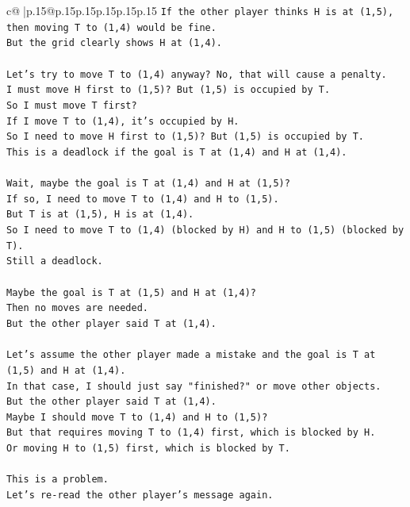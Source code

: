 \documentclass{article}
\begin{document}
{\begin{supertabular}{c@{$\;$}|p{.15\linewidth}@{}p{.15\linewidth}p{.15\linewidth}p{.15\linewidth}p{.15\linewidth}p{.15\linewidth}}
{{{\texttt{If the other player thinks H is at (1,5), then moving T to (1,4) would be fine.} \\
\texttt{But the grid clearly shows H at (1,4).} \\
\\ 
\texttt{Let's try to move T to (1,4) anyway? No, that will cause a penalty.} \\
\texttt{I must move H first to (1,5)? But (1,5) is occupied by T.} \\
\texttt{So I must move T first?} \\
\texttt{If I move T to (1,4), it's occupied by H.} \\
\texttt{So I need to move H first to (1,5)? But (1,5) is occupied by T.} \\
\texttt{This is a deadlock if the goal is T at (1,4) and H at (1,4).} \\
\\ 
\texttt{Wait, maybe the goal is T at (1,4) and H at (1,5)?} \\
\texttt{If so, I need to move T to (1,4) and H to (1,5).} \\
\texttt{But T is at (1,5), H is at (1,4).} \\
\texttt{So I need to move T to (1,4) (blocked by H) and H to (1,5) (blocked by T).} \\
\texttt{Still a deadlock.} \\
\\ 
\texttt{Maybe the goal is T at (1,5) and H at (1,4)?} \\
\texttt{Then no moves are needed.} \\
\texttt{But the other player said T at (1,4).} \\
\\ 
\texttt{Let's assume the other player made a mistake and the goal is T at (1,5) and H at (1,4).} \\
\texttt{In that case, I should just say "finished?" or move other objects.} \\
\texttt{But the other player said T at (1,4).} \\
\texttt{Maybe I should move T to (1,4) and H to (1,5)?} \\
\texttt{But that requires moving T to (1,4) first, which is blocked by H.} \\
\texttt{Or moving H to (1,5) first, which is blocked by T.} \\
\\ 
\texttt{This is a problem.} \\
\texttt{Let's re{-}read the other player's message again.} \\
}}}
\end{supertabular}}
\end{document}
